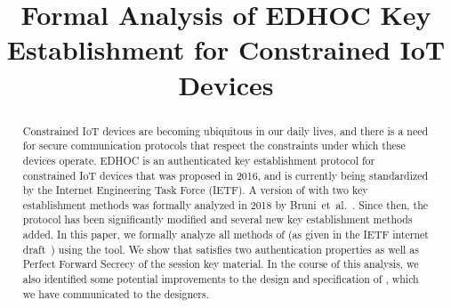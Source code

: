 \documentclass[runningheads, envcountsame, hidelinks, a4paper, draft, x11names]{llncs}
\begin{document}
\title{Formal Analysis of EDHOC Key Establishment for Constrained IoT Devices}
%
\author{}
%
%
\authorrunning{}
%
\institute{}
%
\maketitle
%


\begin{abstract}
Constrained IoT devices are becoming ubiquitous in our daily lives,
and there is a need for secure communication protocols that respect the
constraints under which these devices operate.
%
EDHOC is an authenticated key establishment protocol for constrained IoT
devices that was proposed in 2016, and is currently being standardized by the
Internet Engineering Task Force (IETF).
%
A version of \mEdhoc{} with two key establishment methods was formally analyzed
in 2018 by Bruni~et~al.~\cite{DBLP:conf/secsr/BruniJPS18}.
%
Since then, the protocol has been significantly modified and several new key
establishment methods added.
%
In this paper, we formally analyze all methods of \mEdhoc{} (as given in
the IETF internet draft~\cite{our-analysis-selander-lake-edhoc-01}) using the
\mTamarin{} tool.
%
We show that \mEdhoc{} satisfies two authentication properties as well as
Perfect Forward Secrecy of the session key material.
%
In the course of this analysis, we also identified some potential improvements to the
design and specification of \mEdhoc, which we have communicated to
the designers.
%
\end{abstract}
%
\end{document}
